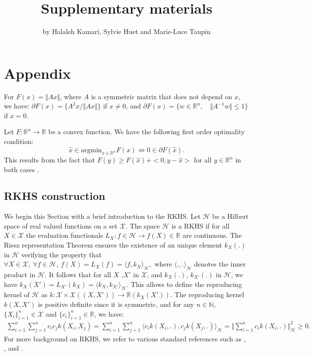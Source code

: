 \title{Supplementary materials}
\author{by Halaleh Kamari, Sylvie Huet and Marie-Luce Taupin}

\maketitle


\section{Appendix} \label{app:technical}
\begin{mydef}\label{rem:subdiff}
For $F(x)=\Vert Ax\Vert$, where $A$ is a symmetric matrix that does not depend on $x$, we have: $\partial F(x)=\{{A^2x/\Vert Ax\Vert}\}$ if $x\neq 0$, and $\partial F(x)=\{w\in\mathbb{R}^n,\quad\Vert A^{-1}w\Vert\leq 1\}$ if $x=0$.
\end{mydef}
\begin{mydef}\label{fooc}
Let $F:\mathbb{R}^n\rightarrow \mathbb{R}$ be a convex function. We have the following first order optimality condition:
$$\widehat{x}\in \text{argmin}_{x\in\mathbb{R}^n}F(x)\Leftrightarrow 0\in\partial F(\widehat{x}).$$
This results from the fact that $F(y)\geq F(\widehat{x})+ <0,y-\widehat{x}> $ for all $y\in\mathbb{R}^n$ in both cases \citep{giraud2014introduction}.
\end{mydef}
\subsection{RKHS construction}\label{subsec:Data}
We begin this Section with a brief introduction to the RKHS.
Let $\mathcal{H}$ be a Hilbert space of real valued functions on a set $\mathcal{X}$. The space $\mathcal{H}$ is a RKHS if for all $X\in\mathcal{X}$ the evaluation functionals $L_X:f\in\mathcal{H}\rightarrow f(X)\in\mathbb{R}$ are continuous. The Riesz representation Theorem ensures the existence of an unique element $k_X(.)$ in $\mathcal{H}$ verifying the property that $
\forall X\in\mathcal{X},\:\forall f\in\mathcal{H},\: f(X)=L_X(f)=\langle f,k_X\rangle_{\mathcal{H}},$
where $\langle.,.\rangle_{\mathcal{H}}$ denotes the inner product in $\mathcal{H}$.
It follows that for all $X$ ,$X'$ in $\mathcal{X}$, and $k_X(.)$, $k_{X'}(.)$ in $\mathcal{H}$, we have
$k_X(X')=L_{X'}(k_X)=\langle k_X,k_{X'}\rangle_{\mathcal{H}}.$
This allows to define the reproducing kernel of $\mathcal{H}$ as $
k:\mathcal{X}\times\mathcal{X}((X,X'))\rightarrow \mathbb{R}(k_X(X')).$
The reproducing kernel $k(X,X')$ is positive definite since it is symmetric, and for any $n\in\mathbb{N}$, $\{X_i\}_{i=1}^n\in\mathcal{X}$ and $\{c_i\}_{i=1}^n\in\mathbb{R}$, we have:
\begin{align*}
\sum_{i=1}^n\sum_{j=1}^nc_ic_jk(X_i,X_j)=\sum_{i=1}^n\sum_{j=1}^n\langle c_i k(X_i,.),c_jk(X_j,.)\rangle_{\mathcal{H}}=\Vert \sum_{i=1}^nc_ik(X_i,.)\Vert_{\mathcal{H}}^2\geq 0.
\end{align*}
For more background on RKHS, we refer to various standard references such as \citet{aronszajn50reproducing}, \citet{saitoh1988theory}, and \citet{Berlinet2004ReproducingKH}.


